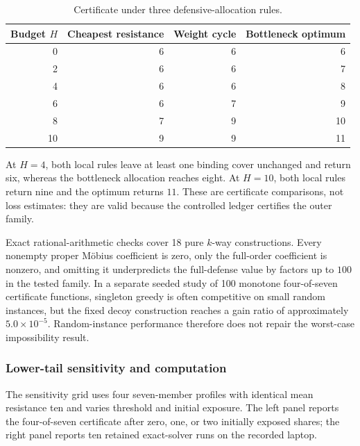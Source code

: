 \begin{table}[!htbp]
\centering
\captionsetup{font=scriptsize,skip=2pt}
\scriptsize
\setlength{\tabcolsep}{6pt}
\renewcommand{\arraystretch}{0.95}
\caption{Certificate under three defensive-allocation rules.}
\label{tab:defense-allocation-detail}
\begin{tabular}{@{}rrrr@{}}
\toprule
Budget \(H\)
& Cheapest resistance
& Weight cycle
& Bottleneck optimum\\
\midrule
0  & 6 & 6 & 6\\
2  & 6 & 6 & 7\\
4  & 6 & 6 & 8\\
6  & 6 & 7 & 9\\
8  & 7 & 9 & 10\\
10 & 9 & 9 & 11\\
\bottomrule
\end{tabular}
\end{table}

At \(H=4\), both local rules leave at least one binding cover unchanged and
return six, whereas the bottleneck allocation reaches eight. At \(H=10\),
both local rules return nine and the optimum returns \(11\). These are
certificate comparisons, not loss estimates: they are valid because the
controlled ledger certifies the outer family.

Exact rational-arithmetic checks cover 18 pure \(k\)-way constructions. Every
nonempty proper M\"obius coefficient is zero, only the full-order coefficient
is nonzero, and omitting it underpredicts the full-defense value by factors up
to \(100\) in the tested family. In a separate seeded study of 100 monotone
four-of-seven certificate functions, singleton greedy is often competitive on
small random instances, but the fixed decoy construction reaches a gain ratio
of approximately \(5.0\times10^{-5}\). Random-instance performance therefore
does not repair the worst-case impossibility result.

\subsubsection{Lower-tail sensitivity and computation}

The sensitivity grid uses four seven-member profiles with identical mean
resistance ten and varies threshold and initial exposure. The left panel
reports the four-of-seven certificate after zero, one, or two initially
exposed shares; the right panel reports ten retained exact-solver runs on the
recorded laptop.

